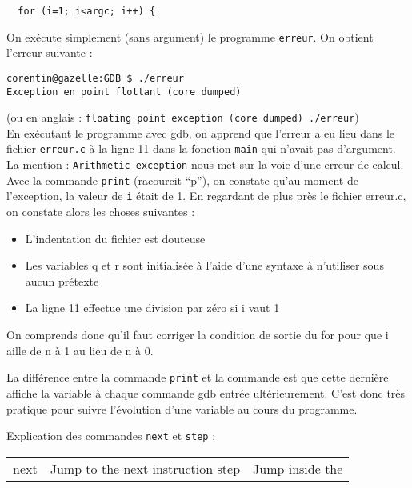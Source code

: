 \documentclass[10pt]{article}
\begin{document}
\begin{enumerate}[label=\textbf{[\alph*]}]
\begin{verbatim}
  for (i=1; i<argc; i++) {
\end{verbatim}

\item On exécute simplement (sans argument) le programme
  \texttt{erreur}. On obtient l'erreur suivante :

\begin{verbatim}
corentin@gazelle:GDB $ ./erreur
Exception en point flottant (core dumped)
\end{verbatim}

(ou en anglais :  \texttt{floating point exception (core dumped)
  ./erreur}) \\

En exécutant le programme avec gdb, on apprend que l'erreur a eu lieu
dans le fichier \texttt{erreur.c} à la ligne 11 dans la fonction
\texttt{main} qui n'avait pas d'argument. La mention :
\texttt{Arithmetic exception} nous met sur la voie d'une erreur de
calcul. \\

Avec la commande \texttt{print} (racourcit ``p''), on constate qu'au
moment de l'exception, la valeur de \texttt{i} était de 1. En
regardant de plus près le fichier erreur.c, on constate alors les
choses suivantes :

\begin{itemize}
\item L'indentation du fichier est douteuse
\item Les variables q et r sont initialisée à l'aide d'une syntaxe à
  n'utiliser sous aucun prétexte
\item La ligne 11 effectue une division par zéro si i vaut 1
\end{itemize}

On comprends donc qu'il faut corriger la condition de sortie du for
pour que i aille de n à 1 au lieu de n à 0.

\item La différence entre la commande \texttt{print} et la commande
   est que cette dernière affiche la variable à chaque
  commande gdb entrée ultérieurement. C'est donc très pratique pour
  suivre l'évolution d'une variable au cours du programme.

\item Explication des commandes \texttt{next} et \texttt{step} :

  \begin{tabular}{|l|l|}
    next & Jump to the next instruction
    step & Jump inside the
  \end{tabular}

\end{enumerate}
\end{document}
